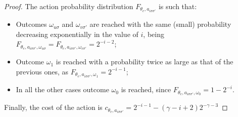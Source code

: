 \begin{proof}
	The action probability distribution $F_{\theta_e, a_{i \sigma  \sigma'} }$ is such that:
	\begin{itemize}
		\item Outcomes  $\omega_{u  \sigma}$ and $\omega_{v  \sigma'} $ are reached with the same (small) probability decreasing exponentially in the value of $i$, being $F_{\theta_e, a_{i \sigma  \sigma'}, \omega_{u  \sigma} } = F_{\theta_e, a_{i \sigma  \sigma'}, \omega_{v  \sigma'} } = 2^{-i-2}$;
		\item Outcome $\omega_1$ is reached with a probability twice as large as that of the previous ones, as $F_{\theta_e, a_{i \sigma \sigma'} , \omega_1 } = 2^{-i-1}$; 
		\item In all the other cases outcome $\omega_0$ is reached, since $F_{\theta_e, a_{i \sigma \sigma'} , \omega_0 } = 1 - 2^{-i}$.
	\end{itemize}
	Finally, the cost of the action is $c_{\theta_e, a_{i \sigma \sigma'} } = 2^{-i-1}-(\gamma-i+2) 2^{-\gamma-3}$
	

\end{proof}
